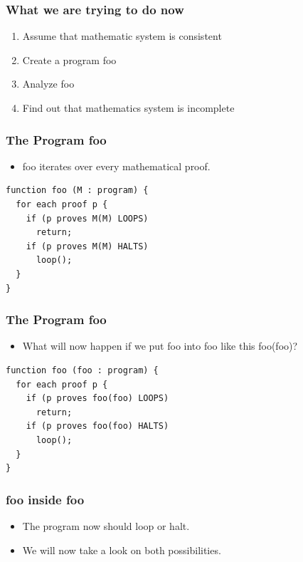 \documentclass[aspectratio=169]{beamer}
\begin{document}
\begin{frame}
	\frametitle{What we are trying to do now}
	\begin{enumerate}
		\item Assume that mathematic system is consistent
		\item Create a program foo
		\item Analyze foo
		\item Find out that mathematics system is incomplete
	\end{enumerate}
\end{frame}

\begin{frame}[fragile]
	\frametitle{The Program foo}
	\begin{itemize}
		\item foo iterates over every mathematical proof.
	\end{itemize}
	\begin{center}
	  \begin{lstlisting}[frame=single]
function foo (M : program) {
  for each proof p {
    if (p proves M(M) LOOPS) 
      return;
    if (p proves M(M) HALTS)
      loop();
  }
}
   \end{lstlisting}
   	\end{center}
\end{frame}

\begin{frame}[fragile]
	\frametitle{The Program foo}
	\begin{itemize}
		\item What will now happen if we put foo into foo like this foo(foo)?
	\end{itemize}
	\begin{center}
	  \begin{lstlisting}[frame=single]
function foo (foo : program) {
  for each proof p {
    if (p proves foo(foo) LOOPS) 
      return;
    if (p proves foo(foo) HALTS)
      loop();
  }
}
   \end{lstlisting}
   	\end{center}
\end{frame}

\begin{frame}
	\frametitle{foo inside foo}
	\begin{itemize}
		\item The program now should loop or halt.
		\item We will now take a look on both possibilities. 
	\end{itemize}
\end{frame}
\end{document}

